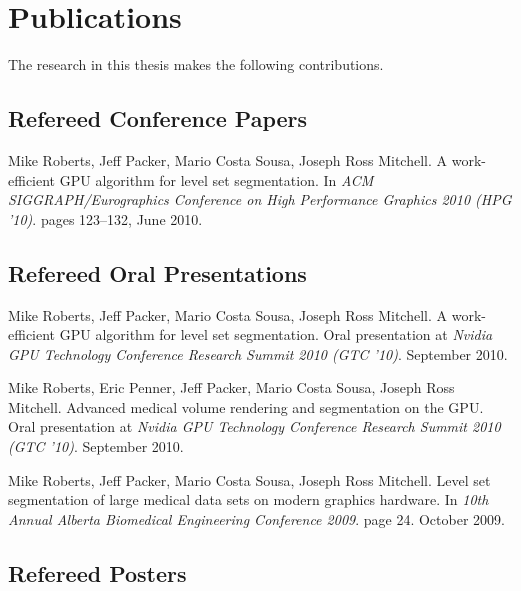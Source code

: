 \fancyhead[RO,LE]{\thepage}
\fancyfoot{} 
\chapter{Publications}
\label{app:publications}

The research in this thesis makes the following contributions.

\section{Refereed Conference Papers}

\begin{noindent}Mike Roberts, Jeff Packer, Mario Costa Sousa, Joseph Ross Mitchell. A work-efficient GPU algorithm for level set segmentation. In \emph{ACM SIGGRAPH/Eurographics Conference on High Performance Graphics 2010 (HPG '10)}. pages 123--132, June 2010.\end{noindent}

\section{Refereed Oral Presentations}

\begin{noindent}Mike Roberts, Jeff Packer, Mario Costa Sousa, Joseph Ross Mitchell. A work-efficient GPU algorithm for level set segmentation. Oral presentation at \emph{Nvidia GPU Technology Conference Research Summit 2010 (GTC '10)}. September 2010.\end{noindent}

\bigskip

\begin{noindent}Mike Roberts, Eric Penner, Jeff Packer, Mario Costa Sousa, Joseph Ross Mitchell. Advanced medical volume rendering and segmentation on the GPU. Oral presentation at \emph{Nvidia GPU Technology Conference Research Summit 2010 (GTC '10)}. September 2010.\end{noindent}

\bigskip

\begin{noindent}Mike Roberts, Jeff Packer, Mario Costa Sousa, Joseph Ross Mitchell. Level set segmentation of large medical data sets on modern graphics hardware. In \emph{10th Annual Alberta Biomedical Engineering Conference 2009}. page 24. October 2009.\end{noindent}

\section{Refereed Posters}

